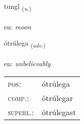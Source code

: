 \documentclass[frontgrid, backgrid]{flacards}\usepackage[]{graphicx}\usepackage[]{color}
\begin{document}
\renewcommand{\flhead}{\vskip5pt \fboxsep=0pt {\small\bfseries\footnotesize Nafnorð | Noun}}
\renewcommand{\fcfoot}{\vskip5pt \fboxsep=0pt \hspace{2pt}{\small\bfseries\footnotesize 2K}}

\renewcommand{\blhead}{\vskip5pt {\small\bfseries\footnotesize Nafnorð | Noun }}
\renewcommand{\bcfoot}{\vskip5pt \hspace{2pt}{\small\bfseries\footnotesize 2K}}


{tungl \small{\textsubscript{(\textit{n.})}} \\[1ex] %
\textphonetic{[tʰuŋl]} \\
en: \emph{moon} \\  [2ex]
\renewcommand*{\arraystretch}{0.8}
}

\renewcommand{\flhead}{\vskip5pt \fboxsep=0pt {\small\bfseries\footnotesize Atviksorð | Adverb}}
\renewcommand{\fcfoot}{\vskip5pt \fboxsep=0pt \hspace{2pt}{\small\bfseries\footnotesize 2K}}

\renewcommand{\blhead}{\vskip5pt {\small\bfseries\footnotesize Atviksorð | Adverb }}
\renewcommand{\bcfoot}{\vskip5pt \hspace{2pt}{\small\bfseries\footnotesize 2K}}


{ótrúlega \small{\textsubscript{(\textit{adv.})}} \\[1ex] %
\textphonetic{[ouːtʰrulɛɣa]} \\
en: \emph{unbelievably} \\  [2ex]
\renewcommand*{\arraystretch}{0.8}
\begin{tabular}{ll}
\textsc{pos}: & ótrúlega \\ 
\textsc{comp.}: & ótrúlegar \\ 
\textsc{superl.}: & ótrúlegast \\
\end{tabular}
}
\end{document}
